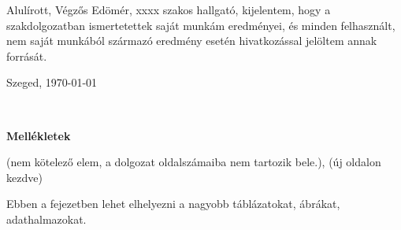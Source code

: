 \documentclass[a4paper,12pt]{report}
\theoremstyle{definition}
\theoremstyle{remark}
\begin{document}
Alulírott, Végzős Edömér, xxxx szakos hallgató, kijelentem, hogy a szakdolgozatban ismertetettek saját munkám eredményei, és minden felhasznált, nem saját munkából származó eredmény esetén hivatkozással jelöltem annak forrását. 


\begin{flushleft}
\vspace*{1cm}
Szeged, \today
\end{flushleft}

\begin{flushright}
 \vspace*{1cm}
 \makebox[7cm]{\rule{6cm}{.4pt}}\\
\end{flushright}

\pagebreak

\newpage
{\Huge \bf Mellékletek}


\vspace{2 cm}

(nem kötelező elem, a dolgozat oldalszámaiba nem tartozik bele.), (új oldalon kezdve)

Ebben a fejezetben lehet elhelyezni a nagyobb táblázatokat, ábrákat, adathalmazokat.
\end{document}

